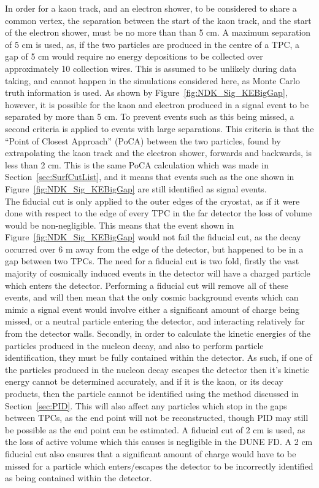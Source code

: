 In order for a kaon track, and an electron shower, to be considered to share a common vertex, the separation between the start of the kaon track, and the start of the electron shower, must be no more than than 5 cm. A maximum separation of 5 cm is used, as, if the two particles are produced in the centre of a TPC, a gap of 5 cm would require no energy depositions to be collected over approximately 10 collection wires. This is assumed to be unlikely during data taking, and cannot happen in the simulations considered here, as Monte Carlo truth information is used. As shown by Figure~\ref{fig:NDK_Sig_KEBigGap}, however, it is possible for the kaon and electron produced in a signal event to be separated by more than 5 cm. To prevent events such as this being missed, a second criteria is applied to events with large separations. This criteria is that the ``Point of Closest Approach'' (PoCA) between the two particles, found by extrapolating the kaon track and the electron shower, forwards and backwards, is less than 2 cm. This is the same PoCA calculation which was made in Section~\ref{sec:SurfCutList}, and it means that events such as the one shown in Figure~\ref{fig:NDK_Sig_KEBigGap} are still identified as signal events. \\

The fiducial cut is only applied to the outer edges of the cryostat, as if it were done with respect to the edge of every TPC in the far detector the loss of volume would be non-negligible. This means that the event shown in Figure~\ref{fig:NDK_Sig_KEBigGap} would not fail the fiducial cut, as the decay occurred over 6 m away from the edge of the detector, but happened to be in a gap between two TPCs. The need for a fiducial cut is two fold, firstly the vast majority of cosmically induced events in the detector will have a charged particle which enters the detector. Performing a fiducial cut will remove all of these events, and will then mean that the only cosmic background events which can mimic a signal event would involve either a significant amount of charge being missed, or a neutral particle entering the detector, and interacting relatively far from the detector walls. Secondly, in order to calculate the kinetic energies of the particles produced in the nucleon decay, and also to perform particle identification, they must be fully contained within the detector. As such, if one of the particles produced in the nucleon decay escapes the detector then it's kinetic energy cannot be determined accurately, and if it is the kaon, or its decay products, then the particle cannot be identified using the method discussed in Section~\ref{sec:PID}. This will also affect any particles which stop in the gaps between TPCs, as the end point will not be reconstructed, though PID may still be possible as the end point can be estimated. A fiducial cut of 2 cm is used, as the loss of active volume which this causes is negligible in the DUNE FD. A 2 cm fiducial cut also ensures that a significant amount of charge would have to be missed for a particle which enters/escapes the detector to be incorrectly identified as being contained within the detector. \\

